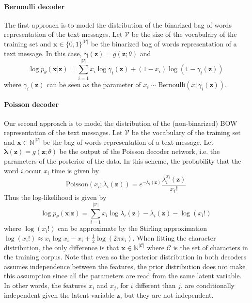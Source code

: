 \documentclass[10pt]{article}
\newcommand{\nat}{\mathbb{N}}
\newcommand{\bernoulli}{\mathrm{Bernoulli}}
\newcommand{\poisson}{\mathrm{Poisson}}
\begin{document}
\paragraph{Bernoulli decoder} The first approach is to model the distribution of the binarized bag of words representation of the text messages. Let $\mathcal{V}$ be the size of the vocabulary of the training set and $\mathbf{x}\in \{0, 1\}^{|\mathcal{V}|}$ be the binarized bag of words representation of a text message. In this case, $\bm{\gamma}(\mathbf{z}) = g(\mathbf{z};\theta)$ and
\begin{equation}
	\log p_\theta(\mathbf{x}|\mathbf{z}) 
	= \sum_{i=1}^{|\mathcal{V}|}x_i\log\gamma_i(\mathbf{z}) + (1-x_i)\log(1-\gamma_i(\mathbf{z}))
\end{equation}
where $\gamma_i(\mathbf{z})$ can be seen as the parameter of $x_i \sim \bernoulli(x;\gamma_i(\mathbf{z}))$.

\paragraph{Poisson decoder} Our second approach is to model the distribution of the (non-binarized) BOW representation of the text messages. Let $\mathcal{V}$ be the vocabulary of the training set and $\mathbf{x}\in \nat^{|\mathcal{V}|}$ be the bag of words representation of a text message. Let $\bm{\lambda}(\mathbf{z})=g(\mathbf{z};\theta)$ be the output of the Poisson decoder network, i.e. the parameters of the posterior of the data. In this scheme, the probability that the word $i$ occur $x_i$ time is given by 
\begin{equation}
\poisson(x_i;\lambda_i(\mathbf{z}))
=e^{-\lambda_i(\mathbf{z})}\frac{\lambda_i^{x_i}(\mathbf{z})}{x_i!}
\end{equation}
Thus the log-likelihood is given by 
\begin{equation}
\log p_\theta(\mathbf{x}|\mathbf{z}) 
= \sum_{i=1}^{|\mathcal{V}|}x_i\log\lambda_i(\mathbf{z}) - \lambda_i(\mathbf{z}) -\log(x_i!)
\end{equation}
where $\log(x_i!)$ can be approximate by the Stirling approximation $\log(x_i!) \approx x_i \log x_i - x_i + \frac{1}{2} \log(2 \pi x_i)$. 
When fitting the character distribution, the only difference is that $\mathbf{x}\in \nat^{\mathcal{|C|}}$ where $\mathcal{C}$ is the set of characters in the training corpus. Note that even so the posterior distribution in both decoders assumes independence between the features, the prior distribution does not make this assumption since all the parameters are read from the same latent variable. In other words, the features $x_i$ and $x_j$, for $i$ different than $j$, are conditionally independent given the latent variable $\mathbf{z}$, but they are not independent.
\end{document}
